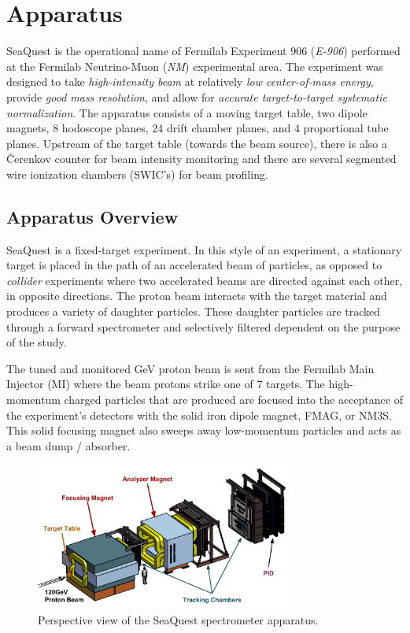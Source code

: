 \chapter{Apparatus}

SeaQuest is the operational name of Fermilab Experiment 906 (\emph{E-906}) performed at the Fermilab Neutrino-Muon (\emph{NM}) experimental area. The experiment was designed to take \emph{high-intensity beam} at relatively \emph{low center-of-mass energy}, provide \emph{good mass resolution}, and allow for \emph{accurate target-to-target systematic normalization}. The apparatus consists of a moving target table, two dipole magnets, 8 hodoscope planes, 24 drift chamber planes, and 4 proportional tube planes. Upstream of the target table (towards the beam source), there is also a \v{C}erenkov counter for beam intensity monitoring and there are several segmented wire ionization chambers (SWIC's) for beam profiling.

\section{Apparatus Overview}

SeaQuest is a fixed-target experiment. In this style of an experiment, a stationary target is placed in the path of an accelerated beam of particles, as opposed to \emph{collider} experiments where two accelerated beams are directed against each other, in opposite directions. The proton beam interacts with the target material and produces a variety of daughter particles. These daughter particles are tracked through a forward spectrometer and selectively filtered dependent on the purpose of the study.

The tuned and monitored \unit[120]{GeV} proton beam is sent from the Fermilab Main Injector (MI) where the beam protons strike one of 7 targets. The high-momentum charged particles that are produced are focused into the acceptance of the experiment's detectors with the solid iron dipole magnet, FMAG, or NM3S. This solid focusing magnet also sweeps away low-momentum particles and acts as a beam dump / absorber.

\begin{figure}
	\begin{center}
		\includegraphics[width=0.75\textwidth]{figures/apparatus/Spectrometer.png}
		\caption{Perspective view of the SeaQuest spectrometer apparatus.}
		\label{fig:spectrometer-perspective}
	\end{center}
\end{figure}

